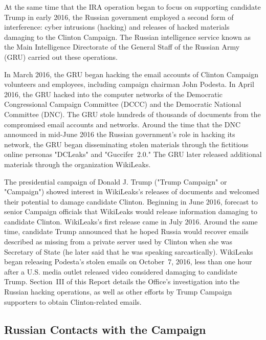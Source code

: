 At the same time that the IRA operation began to focus on supporting candidate Trump in early 2016, the Russian government employed a second form of interference: cyber intrusions (hacking) and releases of hacked materials damaging to the Clinton Campaign.
The Russian intelligence service known as the Main Intelligence Directorate of the General Staff of the Russian Army (GRU) carried out these operations.

In March 2016, the GRU began hacking the email accounts of Clinton Campaign volunteers and employees, including campaign chairman John Podesta.
In April 2016, the GRU hacked into the computer networks of the Democratic Congressional Campaign Committee (DCCC) and the Democratic National Committee (DNC).
The GRU stole hundreds of thousands of documents from the compromised email accounts and networks.
Around the time that the DNC announced in mid-June 2016 the Russian government's role in hacking its network, the GRU began disseminating stolen materials through the fictitious online personas "DCLeaks" and "Guccifer~2.0."
The GRU later released additional materials through the organization WikiLeaks.

The presidential campaign of Donald J. Trump ("Trump Campaign" or "Campaign") showed interest in WikiLeaks's releases of documents and welcomed their potential to damage candidate Clinton. Beginning in June 2016,  forecast to senior Campaign officials that WikiLeaks would release information damaging to candidate Clinton.
WikiLeaks's first release came in July 2016.
Around the same time, candidate Trump announced that he hoped Russia would recover emails described as missing from a private server used by Clinton when she was Secretary of State (he later said that he was speaking sarcastically).
 WikiLeaks began releasing Podesta's stolen emails on October~7, 2016, less than one hour after a U.S. media outlet released video considered damaging to candidate Trump.
Section~III of this Report details the Office's investigation into the Russian hacking operations, as well as other efforts by Trump Campaign supporters to obtain Clinton-related emails.

\subsection*{Russian Contacts with the Campaign}

